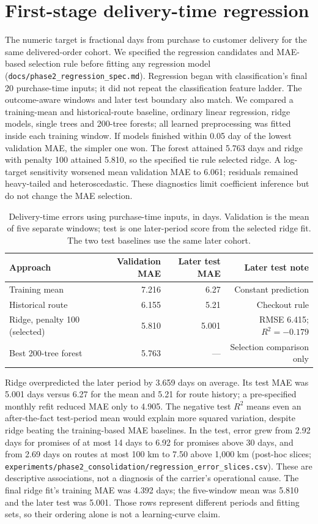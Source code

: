 \documentclass[12pt,a4paper]{article}
\begin{document}
\section*{First-stage delivery-time regression}
The numeric target is fractional days from purchase to customer delivery for the same delivered-order cohort. We specified the regression candidates and MAE-based selection rule before fitting any regression model (\texttt{docs/phase2\_regression\_spec.md}). Regression began with classification's final 20 purchase-time inputs; it did not repeat the classification feature ladder. The outcome-aware windows and later test boundary also match. We compared a training-mean and historical-route baseline, ordinary linear regression, ridge models, single trees and 200-tree forests; all learned preprocessing was fitted inside each training window. If models finished within 0.05 day of the lowest validation MAE, the simpler one won. The forest attained 5.763 days and ridge with penalty 100 attained 5.810, so the specified tie rule selected ridge. A log-target sensitivity worsened mean validation MAE to 6.061; residuals remained heavy-tailed and heteroscedastic. These diagnostics limit coefficient inference but do not change the MAE selection.

\begin{table}[h]
\centering\small
\caption{Delivery-time errors using purchase-time inputs, in days. Validation is the mean of five separate windows; test is one later-period score from the selected ridge fit. The two test baselines use the same later cohort.}
\label{tab:regression}
\begin{tabular}{@{}lrrr@{}}
\toprule
Approach & Validation MAE & Later test MAE & Later test note \\
\midrule
Training mean & 7.216 & 6.27 & Constant prediction \\
Historical route & 6.155 & 5.21 & Checkout rule \\
Ridge, penalty 100 (selected) & 5.810 & 5.001 & RMSE 6.415; $R^2=-0.179$ \\
Best 200-tree forest & 5.763 & --- & Selection comparison only \\
\bottomrule
\end{tabular}
\end{table}

Ridge overpredicted the later period by 3.659 days on average. Its test MAE was 5.001 days versus 6.27 for the mean and 5.21 for route history; a pre-specified monthly refit reduced MAE only to 4.905. The negative test $R^2$ means even an after-the-fact test-period mean would explain more squared variation, despite ridge beating the training-based MAE baselines. In the test, error grew from 2.92 days for promises of at most 14 days to 6.92 for promises above 30 days, and from 2.69 days on routes at most 100 km to 7.50 above 1,000 km (post-hoc slices; \texttt{experiments/phase2\_consolidation/regression\_error\_slices.csv}). These are descriptive associations, not a diagnosis of the carrier's operational cause.
The final ridge fit's training MAE was 4.392 days; the five-window mean was 5.810 and the later test was 5.001. Those rows represent different periods and fitting sets, so their ordering alone is not a learning-curve claim.
\end{document}
